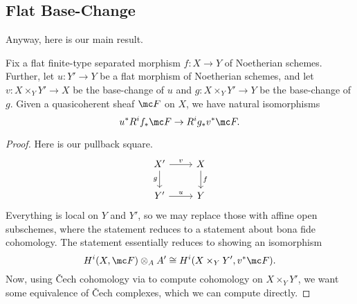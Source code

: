 \documentclass[../notes.tex]{subfiles}
\begin{document}
\subsection{Flat Base-Change}
Anyway, here is our main result.
\begin{theorem} \label{thm:flat-base-change}
	Fix a flat finite-type separated morphism $f\colon X\to Y$ of Noetherian schemes. Further, let $u\colon Y'\to Y$ be a flat morphism of Noetherian schemes, and let $v\colon X\times_YY'\to X$ be the base-change of $u$ and $g\colon X\times_YY'\to Y$ be the base-change of $g$. Given a quasicoherent sheaf $\mc F$ on $X$, we have natural isomorphisms
	\[u^*R^if_*\mc F\to R^ig_*v^*\mc F.\]
\end{theorem}
\begin{proof}
	Here is our pullback square.
	\[\begin{tikzcd}
		{X'} & X \\
		{Y'} & Y
		\arrow["v", from=1-1, to=1-2]
		\arrow["f", from=1-2, to=2-2]
		\arrow["u", from=2-1, to=2-2]
		\arrow["g"', from=1-1, to=2-1]
	\end{tikzcd}\]
	Everything is local on $Y$ and $Y'$, so we may replace those with affine open subschemes, where the statement reduces to a statement about bona fide cohomology. The statement essentially reduces to showing an isomorphism
	\[H^i(X,\mc F)\otimes_AA'\cong H^i(X\times_YY',v^*\mc F).\]
	Now, using \v Cech cohomology via to compute cohomology on $X\times_YY'$, we want some equivalence of \v Cech complexes, which we can compute directly.
\end{proof}
\end{document}
